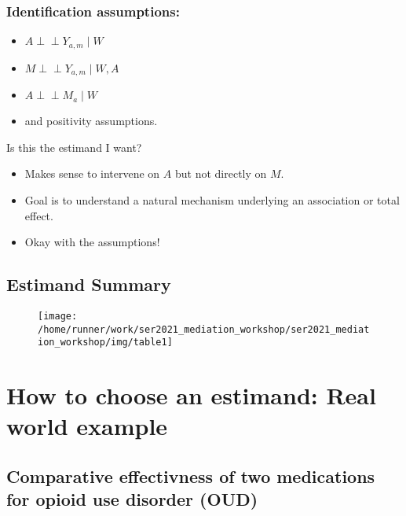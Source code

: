 \documentclass[
  12pt,
]{book}
\providecommand{\tightlist}{%
  \setlength{\itemsep}{0pt}\setlength{\parskip}{0pt}}
\theoremstyle{definition}
\theoremstyle{definition}
\theoremstyle{definition}
\newcommand{\indep}{\mbox{$\perp\!\!\!\perp$}}
\newcommand{\1}{\mathbbm{1}}
\begin{document}
\hypertarget{identification-assumptions-2}{%
\subsection{Identification assumptions:}\label{identification-assumptions-2}}

\begin{itemize}
\tightlist
\item
  \(A \indep Y_{a,m} \mid W\)
\item
  \(M \indep Y_{a,m} \mid W, A\)
\item
  \(A \indep M_a \mid W\)
\item
  and positivity assumptions.
\end{itemize}

Is this the estimand I want?

\begin{itemize}
\tightlist
\item
  Makes sense to intervene on \(A\) but not directly on \(M\).
\item
  Goal is to understand a natural mechanism underlying an association or total
  effect.
\item
  Okay with the assumptions!
\end{itemize}

\hypertarget{estimand-summary}{%
\section{Estimand Summary}\label{estimand-summary}}

\begin{figure}

{\centering \texttt{[image: /home/runner/work/ser2021\_mediation\_workshop/ser2021\_mediation\_workshop/img/table1]} 

}

\end{figure}

\hypertarget{estimandirl}{%
\chapter{How to choose an estimand: Real world example}\label{estimandirl}}

\hypertarget{comparative-effectivness-of-two-medications-for-opioid-use-disorder-oud}{%
\section{Comparative effectivness of two medications for opioid use disorder (OUD)}\label{comparative-effectivness-of-two-medications-for-opioid-use-disorder-oud}}
\end{document}
